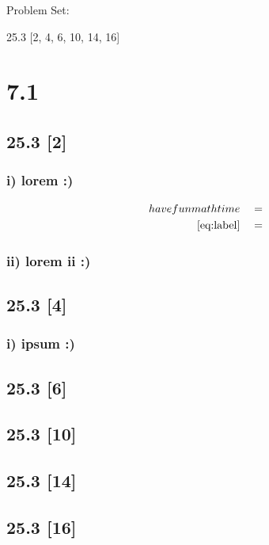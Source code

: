 \documentclass{article}
\begin{document}
{\large \noindent Problem Set:}

\par 25.3 [2, 4, 6, 10, 14, 16]
\vspace{5mm}

\noindent \hrulefill

\section*{7.1}
\setcounter{equation}{0}

\subsection*{25.3 [2]}

\subsubsection*{i) lorem :)}

\begin{align}
    \label{eq:label}
    have fun math time && &=
    \\
    \label{eq:label2}
    \eqref{eq:label} && &=
\end{align}
\subsubsection*{ii) lorem ii :)}

\subsection*{25.3 [4]}

\subsubsection*{i) ipsum :)}

\subsection*{25.3 [6]}
\subsection*{25.3 [10]}
\subsection*{25.3 [14]}
\subsection*{25.3 [16]}
\end{document}
